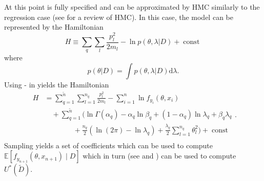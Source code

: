 At this point  is fully specified and can be approximated by HMC similarly to the regression case (see  for a review of HMC). In this case, the model can be represented by the Hamiltonian 
\begin{equation}
	H \equiv  \sum_{q}\sum_{l}\frac{p_{l}^2}{2m_{l}}-\ln p(\theta,\lambda|D)+\operatorname{const}
	\label{ham3}
\end{equation}
where
\begin{equation}
	p(\theta|D) = \int p(\theta,\lambda|D) \mathrm{d} \lambda.
\end{equation}
Using - in  yields the Hamiltonian
\begin{equation}
	\begin{split}
		H&=\sum_{q=1}^{\tilde{n}}\sum_{l=1}^{n_q}\frac{p_{l}^2}{2m_{l}}-\sum_{i=1}^{n}\ln f_{y_i}(\theta,x_i)\\
		&\quad+\sum_{q=1}^{\tilde{n}}\bigg(\ln\Gamma(\alpha_q)-\alpha_q\ln\beta_q+(1-\alpha_q)\ln\lambda_q+\beta_q\lambda_q\\
		&\qquad \qquad+\frac{n_q}{2}(\ln(2\pi)-\ln\lambda_q)+\frac{\lambda_q}{2}\sum_{l=1}^{n_q}\theta_l^2\bigg)+\operatorname{const}\\
	\end{split}.
	\label{ham2}
\end{equation}
Sampling  yields a set of coefficients which can be used to compute $\mathbb{E}[f_{y_{n+1}}(\theta,x_{n+1})\mid D]$ which in turn (see  and ) can be used to compute $U^*(\tilde{D})$.


